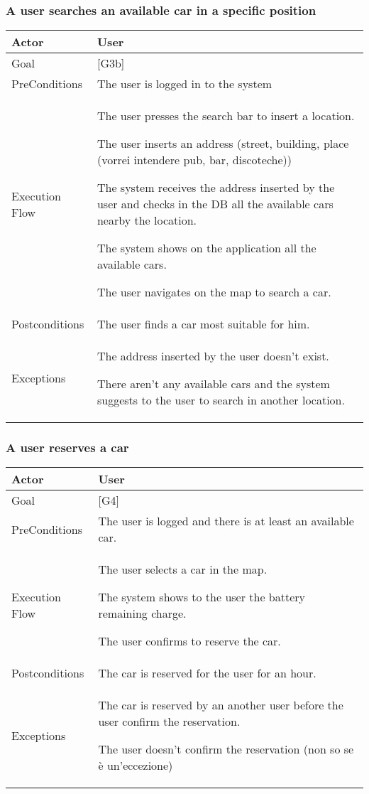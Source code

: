 \documentclass{article}
\begin{document}
	\subsubsection{A user searches an available car in a specific position}
	\begin{tabularx}{\textwidth}{  l  X  }
		\hline
		Actor & User\\
		\hline
		Goal & [G3b]\\
		\hline
		PreConditions & The user is logged in to the system\\
		\hline
		Execution Flow & \item{The user presses the search bar to insert a location.}
										 \item{The user inserts an address (street, building, place (vorrei intendere pub, bar, discoteche))}
										 \item{The system receives the address inserted by the user and checks in the DB all the available cars nearby the location.}
										 \item{The system shows on the application all the available cars.}
										 \item{The user navigates on the map to search a car.}\\
		\hline
		Postconditions & The user finds a car most suitable for him.\\
		\hline
		Exceptions & \item{The address inserted by the user doesn't exist.}
								 \item{There aren't any available cars and the system suggests to the user to search in another location.}\\
		\hline
	\end{tabularx}

	\subsubsection{A user reserves a car}
	\begin{tabularx}{\textwidth}{  l  X  }
		\hline
		Actor & User\\
		\hline
		Goal & [G4]\\
		\hline
		PreConditions & The user is logged and there is at least an available car.\\
		\hline
		Execution Flow & \item{The user selects a car in the map.}
										 \item{The system shows to the user the battery remaining charge.}
										 \item{The user confirms to reserve the car.}\\
		\hline
		Postconditions & The car is reserved for the user for an hour. \\
		\hline
		Exceptions & \item{The car is reserved by an another user before the user confirm the reservation.}
								 \item{The user doesn't confirm the reservation (non so se è un'eccezione)}\\
		\hline
	\end{tabularx}
\end{document}

